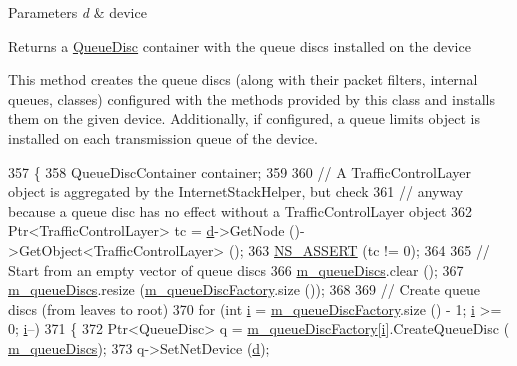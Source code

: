 \begin{DoxyParams}{Parameters}
{\em d} & device \\
\hline
\end{DoxyParams}
\begin{DoxyReturn}{Returns}
a \hyperlink{classns3_1_1QueueDisc}{Queue\+Disc} container with the queue discs installed on the device
\end{DoxyReturn}
This method creates the queue discs (along with their packet filters, internal queues, classes) configured with the methods provided by this class and installs them on the given device. Additionally, if configured, a queue limits object is installed on each transmission queue of the device. 
\begin{DoxyCode}
357 \{
358   QueueDiscContainer container;
359 
360   \textcolor{comment}{// A TrafficControlLayer object is aggregated by the InternetStackHelper, but check}
361   \textcolor{comment}{// anyway because a queue disc has no effect without a TrafficControlLayer object}
362   Ptr<TrafficControlLayer> tc = \hyperlink{buildings__pathloss_8m_a9f9b934daed17a4d3613b6886ff4cf4b}{d}->GetNode ()->GetObject<TrafficControlLayer> ();
363   \hyperlink{assert_8h_a6dccdb0de9b252f60088ce281c49d052}{NS\_ASSERT} (tc != 0);
364 
365   \textcolor{comment}{// Start from an empty vector of queue discs}
366   \hyperlink{classns3_1_1TrafficControlHelper_a0eb99bd58e5d9858d7eb5b4453f886b1}{m\_queueDiscs}.clear ();
367   \hyperlink{classns3_1_1TrafficControlHelper_a0eb99bd58e5d9858d7eb5b4453f886b1}{m\_queueDiscs}.resize (\hyperlink{classns3_1_1TrafficControlHelper_ae4ef4231b502104a4fd4245e53f9ae68}{m\_queueDiscFactory}.size ());
368 
369   \textcolor{comment}{// Create queue discs (from leaves to root)}
370   \textcolor{keywordflow}{for} (\textcolor{keywordtype}{int} \hyperlink{bernuolliDistribution_8m_a6f6ccfcf58b31cb6412107d9d5281426}{i} = \hyperlink{classns3_1_1TrafficControlHelper_ae4ef4231b502104a4fd4245e53f9ae68}{m\_queueDiscFactory}.size () - 1; \hyperlink{bernuolliDistribution_8m_a6f6ccfcf58b31cb6412107d9d5281426}{i} >= 0; \hyperlink{bernuolliDistribution_8m_a6f6ccfcf58b31cb6412107d9d5281426}{i}--)
371     \{
372       Ptr<QueueDisc> q = \hyperlink{classns3_1_1TrafficControlHelper_ae4ef4231b502104a4fd4245e53f9ae68}{m\_queueDiscFactory}[\hyperlink{bernuolliDistribution_8m_a6f6ccfcf58b31cb6412107d9d5281426}{i}].CreateQueueDisc (
      \hyperlink{classns3_1_1TrafficControlHelper_a0eb99bd58e5d9858d7eb5b4453f886b1}{m\_queueDiscs});
373       q->SetNetDevice (\hyperlink{buildings__pathloss_8m_a9f9b934daed17a4d3613b6886ff4cf4b}{d});

\end{DoxyCode}
